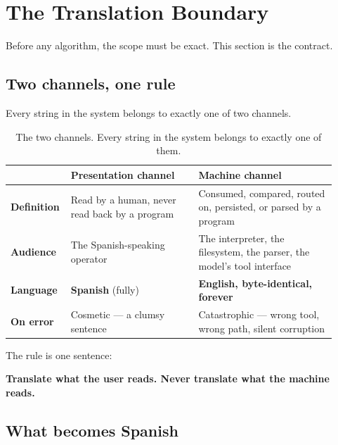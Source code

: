 \section{The Translation Boundary}
\label{sec:translation-boundary}

Before any algorithm, the scope must be exact. This section is the contract.

\subsection{Two channels, one rule}
\label{sec:two-channels-one-rule}

Every string in the system belongs to exactly one of two channels.

\begin{table}[htbp]
\centering
\footnotesize
\caption{The two channels. Every string in the system belongs to exactly one of them.}
\label{tab:two-channels}
\begin{tabular}{@{}p{0.13\linewidth}p{0.38\linewidth}p{0.41\linewidth}@{}}
\toprule
 & \textbf{Presentation channel} & \textbf{Machine channel} \\
\midrule
\textbf{Definition} & Read by a human, never read back by a program & Consumed, compared, routed on, persisted, or parsed by a program \\
\addlinespace
\textbf{Audience} & The Spanish-speaking operator & The interpreter, the filesystem, the parser, the model's tool interface \\
\addlinespace
\textbf{Language} & \textbf{Spanish} (fully) & \textbf{English, byte-identical, forever} \\
\addlinespace
\textbf{On error} & Cosmetic --- a clumsy sentence & Catastrophic --- wrong tool, wrong path, silent corruption \\
\bottomrule
\end{tabular}
\end{table}

The rule is one sentence:

\begin{keyinsight}
\textbf{Translate what the user reads. Never translate what the machine reads.}
\end{keyinsight}

\subsection{What becomes Spanish}
\label{sec:what-becomes-spanish}

